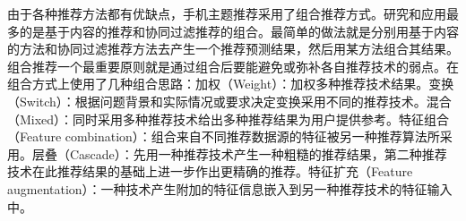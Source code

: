 \begin{enumerate}[(1)]
	由于各种推荐方法都有优缺点，手机主题推荐采用了组合推荐方式。研究和应用最多的是基于内容的推荐和协同过滤推荐的组合。最简单的做法就是分别用基于内容的方法和协同过滤推荐方法去产生一个推荐预测结果，然后用某方法组合其结果。组合推荐一个最重要原则就是通过组合后要能避免或弥补各自推荐技术的弱点。在组合方式上使用了几种组合思路：加权（Weight）：加权多种推荐技术结果。变换（Switch）：根据问题背景和实际情况或要求决定变换采用不同的推荐技术。混合（Mixed）：同时采用多种推荐技术给出多种推荐结果为用户提供参考。特征组合（Feature combination）：组合来自不同推荐数据源的特征被另一种推荐算法所采用。层叠（Cascade）：先用一种推荐技术产生一种粗糙的推荐结果，第二种推荐技术在此推荐结果的基础上进一步作出更精确的推荐。特征扩充（Feature augmentation）：一种技术产生附加的特征信息嵌入到另一种推荐技术的特征输入中。
	\end{enumerate}

